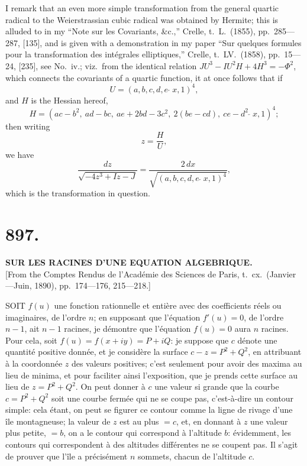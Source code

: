 \documentclass[11pt,a4paper]{article}
\begin{document}
I remark that an even more simple transformation from the general quartic radical to the Weierstrassian cubic radical was obtained by Hermite; this is alluded to in my ``Note sur les Covariants, \&c.,'' Crelle, t.\ L.\ (1855), pp.\ 285---287, [135], and is given with a demonstration in my paper ``Sur quelques formules pour la transformation des int\'egrales elliptiques,'' Crelle, t.\ LV.\ (1858), pp.\ 15---24, [235], see No.\ iv.; viz.\ from the identical relation $JU^3 - IU^2H + 4H^3 = -\Phi^2$, which connects the covariants of a quartic function, it at once follows that if
\[
U = (a, b, c, d, e \,\check{\,}\, x, 1)^4,
\]
and $H$ is the Hessian hereof,
\[
H = (ac-b^2,\ ad-bc,\ ae+2bd-3c^2,\ 2(be-cd),\ ce-d^2 \,\check{\,}\, x, 1)^4;
\]
then writing
\[
z = \frac{H}{U},
\]
we have
\[
\frac{dz}{\sqrt{-4z^3 + Iz - J}} = \frac{2\,dx}{\sqrt{(a, b, c, d, e \,\check{\,}\, x, 1)^4}},
\]
which is the transformation in question.


\section*{897.}
\begin{center}
{\large\bfseries SUR LES RACINES D'UNE EQUATION ALGEBRIQUE.}\\[0.5em]
\small [From the Comptes Rendus de l'Acad\'emie des Sciences de Paris, t.\ cx.\ (Janvier---Juin, 1890), pp.\ 174---176, 215---218.]
\end{center}

SOIT $f(u)$ une fonction rationnelle et enti\`ere avec des coefficients r\'eels ou imaginaires, de l'ordre $n$; en supposant que l'\'equation $f'(u) = 0$, de l'ordre $n - 1$, ait $n - 1$ racines, je d\'emontre que l'\'equation $f(u) = 0$ aura $n$ racines. Pour cela, soit $f(u) = f(x + iy) = P + iQ$: je suppose que $c$ d\'enote une quantit\'e positive donn\'ee, et je consid\`ere la surface $c - z = P^2 + Q^2$, en attribuant \`a la coordonn\'ee $z$ des valeurs positives; c'est seulement pour avoir des maxima au lieu de minima, et pour faciliter ainsi l'exposition, que je prends cette surface au lieu de $z = P^2 + Q^2$. On peut donner \`a $c$ une valeur si grande que la courbe $c = P^2 + Q^2$ soit une courbe ferm\'ee qui ne se coupe pas, c'est-\`a-dire un contour simple: cela \'etant, on peut se figurer ce contour comme la ligne de rivage d'une \^ile montagneuse; la valeur de $z$ est au plus $= c$, et, en donnant \`a $z$ une valeur plus petite, $= b$, on a le contour qui correspond \`a l'altitude $b$: \'evidemment, les contours qui correspondent \`a des altitudes diff\'erentes ne se coupent pas. Il s'agit de prouver que l'\^ile a pr\'ecis\'ement $n$ sommets, chacun de l'altitude $c$.
\end{document}
